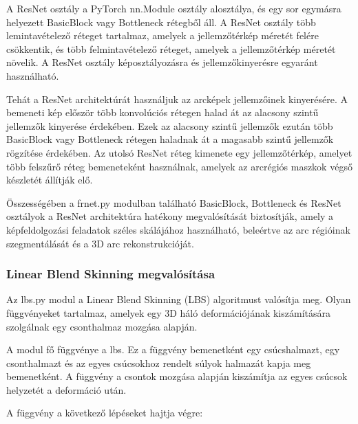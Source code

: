 \documentclass[12pt,a4]{article}
\begin{document}
A ResNet osztály a PyTorch nn.Module osztály alosztálya, és egy sor egymásra helyezett BasicBlock vagy Bottleneck rétegből áll.
A ResNet osztály több lemintavételező réteget tartalmaz, amelyek a jellemzőtérkép méretét felére csökkentik, és több felmintavételező réteget, amelyek a jellemzőtérkép méretét növelik.
 A ResNet osztály képosztályozásra és jellemzőkinyerésre egyaránt használható.
 
 Tehát a ResNet architektúrát használjuk az arcképek jellemzőinek kinyerésére. A bemeneti kép először több konvolúciós rétegen halad át az alacsony szintű jellemzők kinyerése érdekében.
 Ezek az alacsony szintű jellemzők ezután több BasicBlock vagy Bottleneck rétegen haladnak át a magasabb szintű jellemzők rögzítése érdekében. 
 Az utolsó ResNet réteg kimenete egy jellemzőtérkép, amelyet több felszűrő réteg bemeneteként használnak, amelyek az arcrégiós maszkok végső készletét állítják elő.

Összességében a frnet.py modulban található BasicBlock, Bottleneck és ResNet osztályok a ResNet architektúra hatékony megvalósítását biztosítják, 
amely a képfeldolgozási feladatok széles skálájához használható, beleértve az arc régióinak szegmentálását és a 3D arc rekonstrukcióját.

\subsubsection{Linear Blend Skinning megvalósítása}

Az lbs.py modul a Linear Blend Skinning (LBS) algoritmust valósítja meg. 
Olyan függvényeket tartalmaz, amelyek egy 3D háló deformációjának kiszámítására szolgálnak egy csonthalmaz mozgása alapján.

A modul fő függvénye a lbs. Ez a függvény bemenetként egy csúcshalmazt, egy csonthalmazt és az egyes csúcsokhoz rendelt súlyok halmazát kapja meg bemenetként. 
A függvény a csontok mozgása alapján kiszámítja az egyes csúcsok helyzetét a deformáció után.

A függvény a következő lépéseket hajtja végre:
\end{document}
